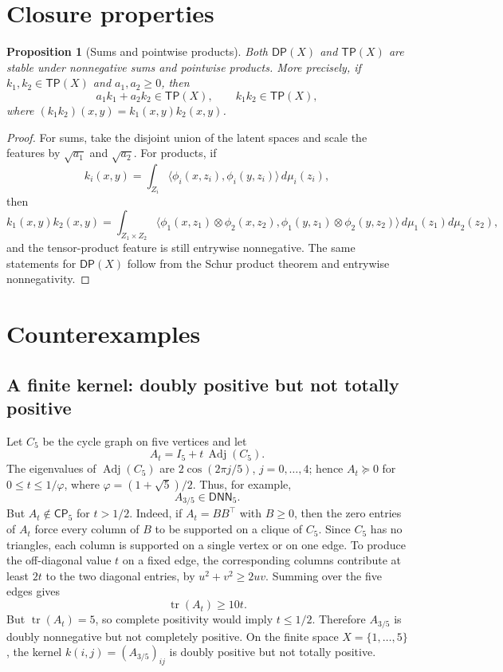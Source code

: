 \documentclass[11pt]{article}
\newcommand{\DNN}{\mathsf{DNN}}
\newcommand{\CP}{\mathsf{CP}}
\newcommand{\DP}{\mathsf{DP}}
\newcommand{\TP}{\mathsf{TP}}
\newcommand{\Adj}{\operatorname{Adj}}
\theoremstyle{definition}
\theoremstyle{plain}
\newtheorem{proposition}{Proposition}
\theoremstyle{remark}
\begin{document}
\section{Closure properties}

\begin{proposition}[Sums and pointwise products]
Both $\DP(X)$ and $\TP(X)$ are stable under nonnegative sums and pointwise
products.  More precisely, if $k_1,k_2\in\TP(X)$ and $a_1,a_2\ge0$, then
\[
a_1k_1+a_2k_2\in\TP(X),
\qquad
k_1k_2\in\TP(X),
\]
where $(k_1k_2)(x,y)=k_1(x,y)k_2(x,y)$.
\end{proposition}

\begin{proof}
For sums, take the disjoint union of the latent spaces and scale the features
by $\sqrt{a_1}$ and $\sqrt{a_2}$.  For products, if
\[
k_i(x,y)=\int_{Z_i}\langle \phi_i(x,z_i),\phi_i(y,z_i)\rangle\,d\mu_i(z_i),
\]
then
\[
k_1(x,y)k_2(x,y)
=
\int_{Z_1\times Z_2}
\big\langle
\phi_1(x,z_1)\otimes\phi_2(x,z_2),
\phi_1(y,z_1)\otimes\phi_2(y,z_2)
\big\rangle
\,d\mu_1(z_1)d\mu_2(z_2),
\]
and the tensor-product feature is still entrywise nonnegative.  The same
statements for $\DP(X)$ follow from the Schur product theorem and entrywise
nonnegativity.
\end{proof}

\section{Counterexamples}

\subsection*{A finite kernel: doubly positive but not totally positive}
Let $C_5$ be the cycle graph on five vertices and let
\[
A_t=I_5+t\,\Adj(C_5).
\]
The eigenvalues of $\Adj(C_5)$ are $2\cos(2\pi j/5)$, $j=0,\dots,4$; hence
$A_t\succeq0$ for $0\le t\le 1/\varphi$, where
$\varphi=(1+\sqrt5)/2$.  Thus, for example,
\[
A_{3/5}\in\DNN_5.
\]
But $A_t\notin\CP_5$ for $t>1/2$.  Indeed, if $A_t=BB^\top$ with $B\ge0$,
then the zero entries of $A_t$ force every column of $B$ to be supported on a
clique of $C_5$.  Since $C_5$ has no triangles, each column is supported on a
single vertex or on one edge.  To produce the off-diagonal value $t$ on a fixed
edge, the corresponding columns contribute at least $2t$ to the two diagonal
entries, by $u^2+v^2\ge 2uv$.  Summing over the five edges gives
\[
\operatorname{tr}(A_t)\ge 10t.
\]
But $\operatorname{tr}(A_t)=5$, so complete positivity would imply
$t\le1/2$.  Therefore $A_{3/5}$ is doubly nonnegative but not completely
positive.  On the finite space $X=\{1,\dots,5\}$, the kernel
$k(i,j)=(A_{3/5})_{ij}$ is doubly positive but not totally positive.
\end{document}
